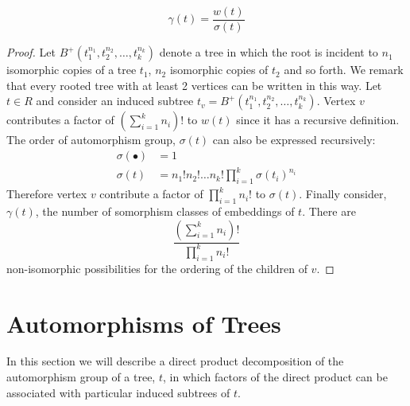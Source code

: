 \begin{lem}
 \begin{equation}\label{eq:3}
  \gamma(t) = \frac{w(t)}{\sigma(t)}
 \end{equation}
\end{lem}
\begin{proof}
 Let $B^{+}(t_1^{n_1},t_2^{n_2},\dots,t_k^{n_k})$ denote a tree in which the root is incident to $n_1$ isomorphic copies 
 of a tree $t_1$, $n_2$ isomorphic copies of $t_2$ and so forth.  We remark that every rooted tree with at least 2 vertices can 
 be written in this way.  Let $t  \in R$ and consider an induced subtree $t_v = B^{+}(t_1^{n_1},t_2^{n_2},\dots,t_k^{n_k})$. 
 Vertex $v$ contributes a factor of $\left( \sum_{i=1}^k n_i \right)! $ to $w(t)$ since it has a recursive definition.  The order of 
 automorphism group, $\sigma(t)$ can also be expressed recursively:
 \begin{align}
  \sigma(\bullet) &= 1 \\
  \sigma(t) &= n_1 ! n_2! \dots n_k ! \prod_{i=1}^k\sigma(t_i)^{n_i} 
 \end{align}
Therefore vertex $v$ contribute a factor of $\prod_{i=1}^k n_i !$ to $\sigma(t)$.  Finally consider, $\gamma(t)$, the number of somorphism classes of embeddings of $t$.  
There are 
\[
 \frac{\left(\sum_{i=1}^k n_i \right)!}{\prod_{i=1}^k n_i!}
\]
non-isomorphic possibilities for the ordering of the children of $v$.
\end{proof}

\section{Automorphisms of Trees}\label{sec:aut}
In this section we will describe a direct product decomposition of the automorphism group of a tree, $t$, in which factors of the direct product can be associated with particular induced subtrees of $t$.  

